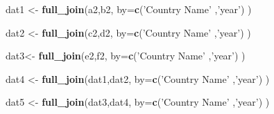 \documentclass[ignorenonframetext,]{beamer}
\newenvironment{Shaded}{\begin{snugshade}}{\end{snugshade}}
\newcommand{\DataTypeTok}[1]{\textcolor[rgb]{0.13,0.29,0.53}{#1}}
\newcommand{\KeywordTok}[1]{\textcolor[rgb]{0.13,0.29,0.53}{\textbf{#1}}}
\newcommand{\NormalTok}[1]{#1}
\newcommand{\OperatorTok}[1]{\textcolor[rgb]{0.81,0.36,0.00}{\textbf{#1}}}
\newcommand{\StringTok}[1]{\textcolor[rgb]{0.31,0.60,0.02}{#1}}
\begin{document}
\begin{frame}[fragile]
\begin{Shaded}
\end{Shaded}

\begin{Shaded}
\begin{Highlighting}[]
\NormalTok{dat1 <-}\StringTok{ }\KeywordTok{full_join}\NormalTok{(a2,b2,}
         \DataTypeTok{by=}\KeywordTok{c}\NormalTok{(}\StringTok{'Country Name'}
\NormalTok{              ,}\StringTok{'year'}\NormalTok{) )}
\end{Highlighting}
\end{Shaded}

\begin{Shaded}
\begin{Highlighting}[]
\NormalTok{dat2 <-}\StringTok{ }\KeywordTok{full_join}\NormalTok{(c2,d2,}
         \DataTypeTok{by=}\KeywordTok{c}\NormalTok{(}\StringTok{'Country Name'}
\NormalTok{              ,}\StringTok{'year'}\NormalTok{) )}
\end{Highlighting}
\end{Shaded}

\begin{Shaded}
\begin{Highlighting}[]
\NormalTok{dat3<-}\StringTok{ }\KeywordTok{full_join}\NormalTok{(e2,f2,}
         \DataTypeTok{by=}\KeywordTok{c}\NormalTok{(}\StringTok{'Country Name'}
\NormalTok{              ,}\StringTok{'year'}\NormalTok{) )}
\end{Highlighting}
\end{Shaded}

\begin{Shaded}
\begin{Highlighting}[]
\NormalTok{dat4 <-}\StringTok{ }\KeywordTok{full_join}\NormalTok{(dat1,dat2,}
         \DataTypeTok{by=}\KeywordTok{c}\NormalTok{(}\StringTok{'Country Name'}
\NormalTok{              ,}\StringTok{'year'}\NormalTok{) )}
\end{Highlighting}
\end{Shaded}

\begin{Shaded}
\begin{Highlighting}[]
\NormalTok{dat5 <-}\StringTok{ }\KeywordTok{full_join}\NormalTok{(dat3,dat4,}
         \DataTypeTok{by=}\KeywordTok{c}\NormalTok{(}\StringTok{'Country Name'}
\NormalTok{              ,}\StringTok{'year'}\NormalTok{) )}
\end{Highlighting}
\end{Shaded}


\end{frame}
\end{document}
